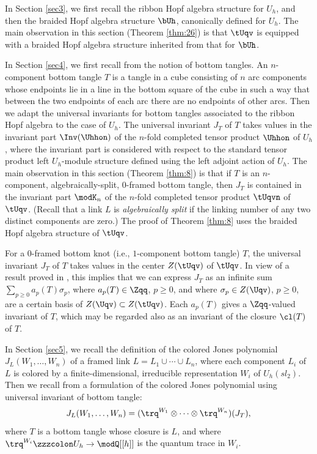 \documentclass{amsart}
\numberwithin{equation}{section}
\numberwithin{figure}{section}
\theoremstyle{plain}
\theoremstyle{definition}
\theoremstyle{remark}
\begin{document}
In Section \ref{sec3}, we first recall the ribbon Hopf algebra
structure for $U_h$, and then the braided Hopf algebra structure
$\bUh$, canonically defined for $U_h$.  The main observation in
this section (Theorem \ref{thm:26}) is that $\tUqv$ is equipped with a
braided Hopf algebra structure inherited from that for
$\bUh$.

In Section \ref{sec4}, we first recall from \cite{H:universal} the
notion of bottom tangles.  An $n$-component bottom tangle $T$ is a
tangle in a cube consisting of $n$ arc components whose endpoints lie
in a line in the bottom square of the cube in such a way that between
the two endpoints of each arc there are no endpoints of other arcs.
Then we adapt the universal invariants for bottom tangles associated
to the ribbon Hopf algebra to the case of $U_h$.  The universal
invariant $J_T$ of $T$ takes values in the invariant part
$\Inv(\Uhhon)$ of the $n$-fold completed tensor product $\Uhhon$ of
$U_h$, where the invariant part is considered with respect to the
standard tensor product left $U_h$-module structure defined using the
left adjoint action of $U_h$.  The main observation in this section
(Theorem \ref{thm:8}) is that if $T$ is an $n$-component,
algebraically-split, $0$-framed bottom tangle, then $J_T$ is contained
in the invariant part $\modK _n$ of the $n$-fold completed tensor product
$\tUqvn$ of $\tUqv$.  (Recall that a link $L$ is {\em algebraically
split} if the linking number of any two distinct components are zero.)
The proof of Theorem \ref{thm:8} uses the braided Hopf algebra
structure of $\tUqv$.

For a $0$-framed bottom knot (i.e., $1$-component bottom tangle) $T$,
the universal invariant $J_T$ of $T$ takes values in the center
$Z(\tUqv)$ of $\tUqv$.  In view of a result proved in \cite{H:uqsl2},
this implies that we can express $J_T$ as an infinite sum
$\sum_{p\ge 0}a_p(T)\sigma _p$, where $a_p(T)\in \Zqq$, $p\ge 0$, and where
$\sigma _p\in Z(\Uqv)$, $p\ge 0$, are a certain basis of $Z(\Uqv)\subset Z(\tUqv)$.
Each $a_p(T)$ gives a $\Zqq$-valued invariant of $T$, which may be
regarded also as an invariant of the closure $\cl(T)$ of $T$.

In Section \ref{sec5}, we recall the definition of the colored Jones
polynomial $J_L(W_1,\ldots,W_n)$ of a framed link $L=L_1\cup \cdots\cup L_n$, where
each component $L_i$ of $L$ is colored by a finite-dimensional,
irreducible representation $W_i$ of $U_h(sl_2)$.  Then we recall from
\cite{H:universal} a formulation of the colored Jones polynomial using
universal invariant of bottom tangle:
\begin{equation*}
  J_L(W_1,\ldots,W_n)=(\trq^{W_1}\otimes \cdots\otimes \trq^{W_n})(J_T),
\end{equation*}
where $T$ is a bottom tangle whose closure is $L$, and where
$\trq^{W_i}\zzzcolon U_h\rightarrow \modQ [[h]]$ is the quantum trace in $W_i$.
\end{document}
